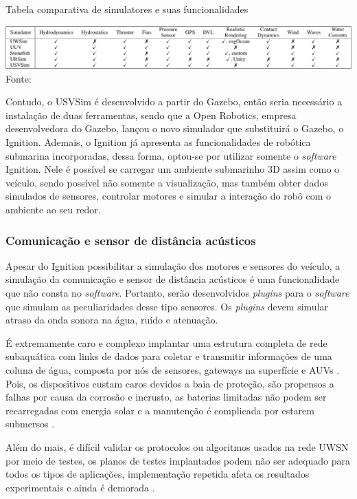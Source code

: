 \begin{table}[h]
    \label{tab:simulators-comparison}
    \caption{Tabela comparativa de simulatores e suas funcionalidades}
    \centering
    \includegraphics[width=1\textwidth]{images/simulators_comparison.png}\\
    \footnotesize Fonte: \cite{simulators-comparison}
\end{table}

Contudo, o USVSim é desenvolvido a partir do Gazebo, então seria necessário a
instalação de duas ferramentas, sendo que a Open Robotics, empresa desenvolvedora do Gazebo, lançou o novo simulador que substituirá o Gazebo, o
Ignition. Ademais, o Ignition já apresenta as funcionalidades de robótica
submarina incorporadas, dessa forma, optou-se por utilizar somente o \textit{software} Ignition. Nele é possível se carregar um ambiente submarinho 3D assim como o veículo, sendo possível não somente a visualização, mas também obter dados simulados de sensores, controlar motores e simular a interação do robô com o ambiente ao seu redor.

\subsubsection*{Comunicação e sensor de distância acústicos}
Apesar do Ignition possibilitar a simulação dos motores e sensores do veículo, a simulação da comunicação e sensor de distância acústicos é uma funcionalidade que não consta no \textit{software}. Portanto, serão desenvolvidos \textit{plugins} para o \textit{software} que simulam as peculiaridades desse tipo sensores. Os \textit{plugins} devem simular atraso da onda sonora na água, ruído e atenuação.

É extremamente caro e complexo implantar uma estrutura completa de rede subaquática com links de dados para coletar e transmitir informações de uma coluna de água, composta por nós de sensores, gateways na superfície e AUVs \cite{godi2021survey}. Pois, os dispositivos custam caros devidos a baia de proteção, são propensos a falhas por causa da corrosão e incrusto, as baterias limitadas não podem ser recarregadas com energia solar e a manutenção é complicada por estarem submersos \cite{akyildiz2005underwater, shantaram2005challenges}.

Além do mais, é difícil validar os protocolos ou algoritmos usados na rede UWSN por meio de testes, os planos de testes implantados podem não ser adequado para todos os tipos de aplicações, implementação repetida afeta os resultados experimentais e ainda é demorada \cite{das2016simulation}.  


